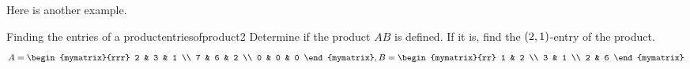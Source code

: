 Here is another example.

\begin{example}{Finding the entries of a product}{entriesofproduct2}
Determine if the product $AB$ is defined. If it is, find the $\left(2, 1 \right)$-entry of the product.
\begin{equation*}
A=
\begin{mymatrix}{rrr}
2 & 3 & 1 \\
7 & 6 & 2 \\
0 & 0 & 0
\end{mymatrix},  B =\begin{mymatrix}{rr}
1 & 2 \\
3 & 1 \\
2 & 6
\end{mymatrix} 
\end{equation*}
\end{example}

